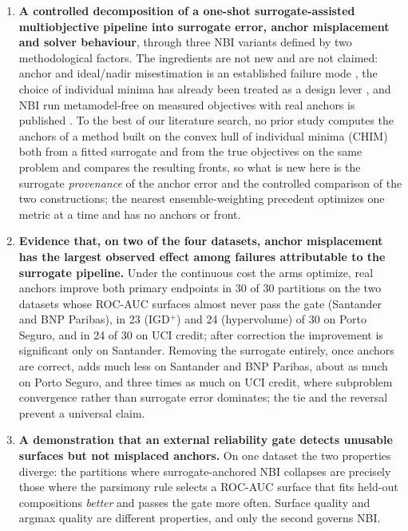 \begin{enumerate}
\item \textbf{A controlled decomposition of a one-shot surrogate-assisted multiobjective pipeline into surrogate
error, anchor misplacement and solver behaviour}, through three NBI variants defined by two methodological factors.
The ingredients are not new and are not claimed: anchor and ideal/nadir misestimation is an established failure mode
\citep{isermann1988payoff,deb2010nadir,he2021normalization}, the choice of individual minima has already been treated
as a design lever \citep{herrmann2026nonextreme}, and NBI run metamodel-free on measured objectives with real anchors
is published \citep{gellerich2023doenbi}. To the best of our literature search, no prior study computes the anchors
of a method built on the convex hull of individual minima (CHIM) both from a fitted surrogate and from the true
objectives on the same problem and compares the resulting fronts, so
what is new here is the surrogate \emph{provenance} of the anchor error and the controlled comparison of the two
constructions; the nearest ensemble-weighting precedent \citep{kwon2024ensemble} optimizes one metric at a time and
has no anchors or front.

\item \textbf{Evidence that, on two of the four datasets, anchor misplacement has the largest observed effect among
failures attributable to the surrogate pipeline.} Under the continuous cost the arms optimize, real anchors improve both
primary endpoints in 30 of 30 partitions on the two datasets whose ROC-AUC surfaces almost never pass the gate
(Santander and BNP Paribas), in 23 (IGD$^+$) and 24 (hypervolume) of 30 on Porto Seguro, and in 24 of 30 on UCI
credit; after correction the improvement is significant only on Santander. Removing the surrogate entirely, once
anchors are correct, adds much less on Santander and BNP Paribas, about as much on Porto Seguro, and three times as
much on UCI credit, where subproblem convergence rather than surrogate error dominates; the tie and the reversal
prevent a universal claim.

\item \textbf{A demonstration that an external reliability gate detects unusable surfaces but not misplaced anchors.}
On one dataset the two properties diverge: the partitions where surrogate-anchored NBI collapses are precisely those
where the parsimony rule selects a ROC-AUC surface that fits held-out compositions \emph{better} and passes the gate more
often. Surface quality and argmax quality are different properties, and only the second governs NBI.


\end{enumerate}
